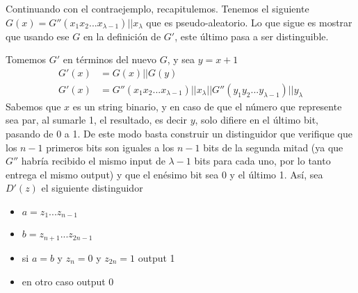 \documentclass[twoside]{tareas}
\begin{document}
\begin{enumerate}
    Continuando con el contraejemplo, recapitulemos. Tenemos el siguiente $G(x) = G''(x_1 x_2 ...x_{\lambda - 1}) || x_{\lambda}$ que es pseudo-aleatorio. Lo que sigue es mostrar que usando ese $G$ en la definición de $G'$, este último pasa a ser distinguible.

    Tomemos $G'$ en términos del nuevo $G$, y sea $y=x+1$
    \begin{align*}
        G'(x) &= G(x)||G(y)\\
        G'(x) &= G''(x_1 x_2 ...x_{\lambda - 1}) || x_{\lambda} || G''(y_1 y_2 ...y_{\lambda - 1}) || y_{\lambda}
    \end{align*}
    Sabemos que $x$ es un string binario, y en caso de que el número que represente sea par, al sumarle 1, el resultado, es decir $y$, solo difiere en el último bit, pasando de 0 a 1. De este modo basta construir un distinguidor que verifique que los $n - 1$ primeros bits son iguales a los $n-1$ bits de la segunda mitad (ya que $G''$ habría recibido el mismo input de $\lambda - 1$ bits para cada uno, por lo tanto entrega el mismo output) y que el enésimo bit sea 0 y el último 1. Así, sea $D'(z)$ el siguiente distinguidor

    \begin{itemize}
        \item $a = z_1 ...z_{n-1}$
        \item $b = z_{n+1} ...z_{2n-1}$
        \item si $a=b$ y $z_n = 0$ y $z_{2n}=1$ output 1
        \item en otro caso output $0$
    \end{itemize}


\end{enumerate}
\end{document}
